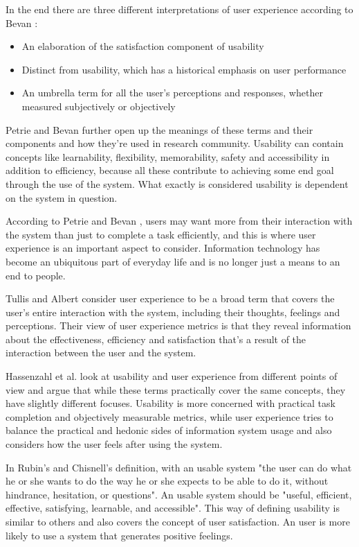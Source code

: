 In the end there are three different interpretations of user experience according to Bevan \cite{bevan2009difference}: \begin{itemize}
\item An  elaboration  of  the  satisfaction  component  of usability
\item Distinct  from  usability,  which  has  a  historical emphasis on user performance
\item An  umbrella  term  for  all  the  user’s  perceptions  and responses,  whether  measured  subjectively  or objectively
\end{itemize}

Petrie and Bevan \cite{bevanevaluation} further open up the meanings of these terms and their components and how they're used in research community. Usability can contain concepts like learnability, flexibility, memorability, safety and accessibility in addition to efficiency, because all these contribute to achieving some end goal through the use of the system. What exactly is considered usability is dependent on the system in question. 

According to Petrie and Bevan \cite{bevanevaluation}, users may want more from their interaction with the system than just to complete a task efficiently, and this is where user experience is an important aspect to consider. Information technology has become an ubiquitous part of everyday life and is no longer just a means to an end to people.

Tullis and Albert \cite{albert2013measuring} consider user experience to be a broad term that covers the user's entire interaction with the system, including their thoughts, feelings and perceptions. Their view of user experience metrics is that they reveal information about the effectiveness, efficiency and satisfaction that's a result of the interaction between the user and the system.

Hassenzahl et al. \cite{hassenzahl2006user} look at usability and user experience from different points of view and argue that while these terms practically cover the same concepts, they have slightly different focuses. Usability is more concerned with practical task completion and objectively measurable metrics, while user experience tries to balance the practical and hedonic sides of information system usage and also considers how the user feels after using the system.

In Rubin's and Chisnell's \cite{rubin2008handbook} definition, with an usable system "the user can do what he or she wants to do the way he or she expects to be able to do it, without hindrance, hesitation, or questions". An usable system should be "useful, efficient, effective, satisfying, learnable, and accessible". This way of defining usability is similar to others and also covers the concept of user satisfaction. An user is more likely to use a system that generates positive feelings.

